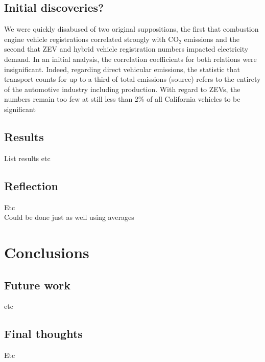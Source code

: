 \documentclass{article}
\begin{document}
\subsection{Initial discoveries?}
We were quickly disabused of two original suppositions, the first that combustion engine vehicle registrations correlated strongly with CO\(_2\) emissions and the second that ZEV and hybrid vehicle registration numbers impacted electricity demand. In an initial analysis, the correlation coefficients for both relations were insignificant. Indeed, regarding direct vehicular emissions, the statistic that transport counts for up to a third of total emissions (source) refers to the entirety of the automotive industry including production. With regard to ZEVs, the numbers remain too few at still less than 2\% of all California vehicles to be significant

\subsection{Results}
List results etc

\subsection{Reflection}
Etc\\
Could be done just as well using averages 


\section{Conclusions}

\subsection{Future work}
etc

\subsection{Final thoughts}
Etc

\medskip


\end{document}
